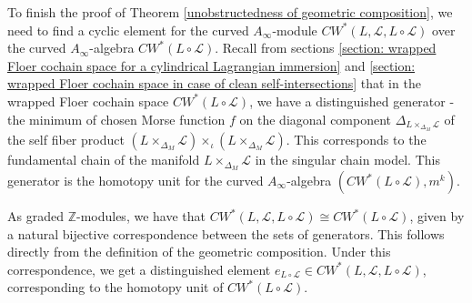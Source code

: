 \documentclass{amsart}
\numberwithin{equation}{section}
\numberwithin{figure}{section}
\begin{document}
	To finish the proof of Theorem \ref{unobstructedness of geometric composition}, we need to find a cyclic element for the curved $A_{\infty}$-module $CW^{*}(L, \mathcal{L}, L \circ \mathcal{L})$ over the curved $A_{\infty}$-algebra $CW^{*}(L \circ \mathcal{L})$. Recall from sections \ref{section: wrapped Floer cochain space for a cylindrical Lagrangian immersion} and \ref{section: wrapped Floer cochain space in case of clean self-intersections} that in the wrapped Floer cochain space $CW^{*}(L \circ \mathcal{L})$, we have a distinguished generator - the minimum of chosen Morse function $f$ on the diagonal component $\Delta_{L \times_{\Delta_{M}} \mathcal{L}}$ of the self fiber product $(L \times_{\Delta_{M}} \mathcal{L}) \times_{\iota} (L \times_{\Delta_{M}} \mathcal{L})$.
This corresponds to the fundamental chain of the manifold $L \times_{\Delta_{M}} \mathcal{L}$ in the singular chain model. This generator is the homotopy unit for the curved $A_{\infty}$-algebra $(CW^{*}(L \circ \mathcal{L}), m^{k})$. \par
	As graded $\mathbb{Z}$-modules, we have that $CW^{*}(L, \mathcal{L}, L \circ \mathcal{L}) \cong CW^{*}(L \circ \mathcal{L})$, given by a natural bijective correspondence between the sets of generators. This follows directly from the definition of the geometric composition. Under this correspondence, we get a distinguished element $e_{L \circ \mathcal{L}} \in CW^{*}(L, \mathcal{L}, L \circ \mathcal{L})$, corresponding to the homotopy unit of $CW^{*}(L \circ \mathcal{L})$. \par
\end{document}
